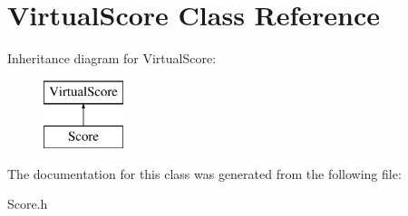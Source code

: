 \hypertarget{class_virtual_score}{\section{Virtual\+Score Class Reference}
\label{class_virtual_score}
}
Inheritance diagram for Virtual\+Score\+:\begin{figure}[H]
\begin{center}
\leavevmode
\includegraphics[height=2.000000cm]{class_virtual_score}
\end{center}
\end{figure}


The documentation for this class was generated from the following file\+:\begin{DoxyCompactItemize}
\item 
Score.\+h\end{DoxyCompactItemize}
